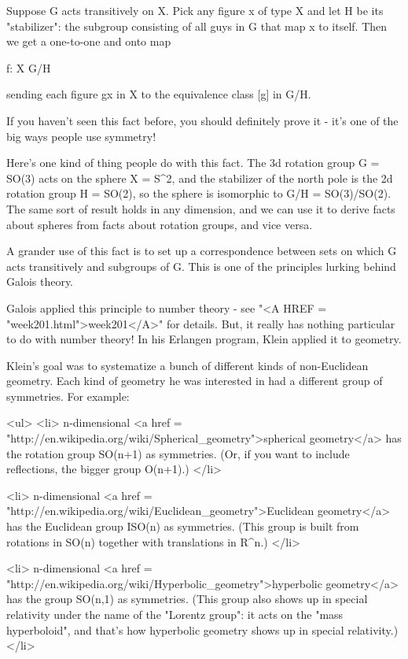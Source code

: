 Suppose G acts transitively on X.   Pick any figure x of type X and let 
H be its "stabilizer": the subgroup consisting of all guys in G that map 
x to itself.  Then we get a one-to-one and onto map

f: X \to  G/H

sending each figure gx in X to the equivalence class [g] in G/H.  

If you haven't seen this fact before, you should definitely prove it -
it's one of the big ways people use symmetry!

Here's one kind of thing people do with this fact. The 3d rotation 
group G = SO(3) acts on the sphere X = S^{2}, and the stabilizer of 
the north pole is the 2d rotation group H = SO(2), so the sphere is 
isomorphic to G/H = SO(3)/SO(2).   The same sort of result holds in any
dimension, and we can use it to derive facts about spheres from facts 
about rotation groups, and vice versa.

A grander use of this fact is to set up a correspondence between 
sets on which G acts transitively and subgroups of G.  This is
one of the principles lurking behind Galois theory.

Galois applied this principle to number theory - see "<A HREF =
"week201.html">week201</A>" for details.  But, it really has
nothing particular to do with number theory!  In his Erlangen program,
Klein applied it to geometry.

Klein's goal was to systematize a bunch of different kinds of non-Euclidean
geometry.  Each kind of geometry he was interested in had a different
group of symmetries.   For example:  

<ul>
<li>
 n-dimensional <a href =
 "http://en.wikipedia.org/wiki/Spherical_geometry">spherical
 geometry</a> has the rotation group SO(n+1) as symmetries.  (Or, if
 you want to include reflections, the bigger group O(n+1).)
</li>

<li>
 n-dimensional <a href =
 "http://en.wikipedia.org/wiki/Euclidean_geometry">Euclidean
 geometry</a> has the Euclidean group ISO(n) as symmetries.  (This
 group is built from rotations in SO(n) together with translations in
 R^{n}.) 
</li>

<li>
 n-dimensional <a href =
 "http://en.wikipedia.org/wiki/Hyperbolic_geometry">hyperbolic
 geometry</a> has the group SO(n,1) as symmetries.  (This group also
 shows up in special relativity under the name of the "Lorentz
 group": it acts on the "mass hyperboloid", and that's
 how hyperbolic geometry shows up in special relativity.)  
</li>

